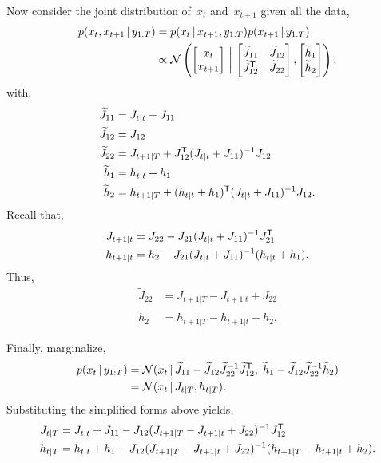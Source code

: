 \documentclass{article}
\begin{document}
Now consider the joint distribution of~$x_t$ and~$x_{t+1}$ given all the data,
\begin{align}
  p(x_t, x_{t+1} \,|\, y_{1:T}) 
  &= p(x_t \,|\, x_{t+1}, y_{1:T}) p(x_{t+1} \,|\, y_{1:T}) \\
  &\propto \mathcal{N} \left(
  \begin{bmatrix} x_t \\ x_{t+1}  \end{bmatrix}
  \, \bigg| \,
  \begin{bmatrix} 
    \widetilde{J}_{11}        & \widetilde{J}_{12} \\
    \widetilde{J}_{12}^{\mathsf{T}} & \widetilde{J}_{22} 
  \end{bmatrix},
  \begin{bmatrix} 
    \widetilde{h}_1 \\ 
    \widetilde{h}_2 
  \end{bmatrix}
  \right), 
\end{align}
with,
\begin{align}
  \widetilde{J}_{11} &= J_{t|t} + J_{11} \\ 
  \widetilde{J}_{12} &= J_{12} \\
  \widetilde{J}_{22} &= J_{t+1|T} + J_{12}^{\mathsf{T}} (J_{t|t} + J_{11})^{-1} J_{12} \\
  \widetilde{h}_1 &= h_{t|t} + h_1 \\
  \widetilde{h}_2 &= h_{t+1|T} + (h_{t|t} + h_1)^{\mathsf{T}} (J_{t|t} + J_{11})^{-1} J_{12}.
\end{align}
Recall that,
\begin{align}
  J_{t+1|t} &= J_{22} - J_{21} (J_{t|t} + J_{11})^{-1}J_{21}^{\mathsf{T}} \\
  h_{t+1|t} &= h_2 - J_{21} (J_{t|t} + J_{11})^{-1} (h_{t|t} + h_1).
\end{align}
Thus, 
\begin{align}
  \widetilde{J}_{22} &= J_{t+1|T} - J_{t+1|t} + J_{22} \\
  \widetilde{h}_{2} &= h_{t+1|T} - h_{t+1|t} + h_2.
\end{align}


Finally, marginalize,
\begin{align}
  p(x_t \,|\, y_{1:T}) 
  &= \mathcal{N}(x_t \,|\, 
    \widetilde{J}_{11} - \widetilde{J}_{12} \widetilde{J}_{22}^{-1} \widetilde{J}_{12}^{\mathsf{T}}, \;
    \widetilde{h}_{1} - \widetilde{J}_{12} \widetilde{J}_{22}^{-1} \widetilde{h}_2) \\
  &= \mathcal{N}(x_t \,|\, J_{t|T}, h_{t|T}).
\end{align}
Substituting the simplified forms above yields,
\begin{align}
  J_{t|T} &= J_{t|t} + J_{11} - J_{12} (J_{t+1|T} - J_{t+1|t} + J_{22})^{-1} J_{12}^{\mathsf{T}} \\
  h_{t|T} &= h_{t|t} + h_1 - J_{12} (J_{t+1|T} - J_{t+1|t} + J_{22})^{-1} (h_{t+1|T} - h_{t+1|t} +h_2).
\end{align}
\end{document}
